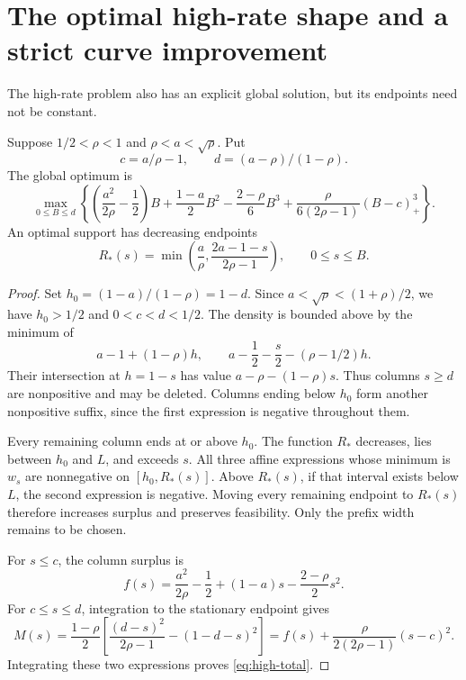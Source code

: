 \section{The optimal high-rate shape and a strict curve improvement}\label{sec:high-rate}

The high-rate problem also has an explicit global solution, but its endpoints need not be constant.
\begin{theorem}\label{thm:high-shape}
Suppose $1/2<\rho<1$ and $\rho<a<\sqrt\rho$. Put
\[
 c=a/\rho-1,\qquad d=(a-\rho)/(1-\rho).
\]
The global optimum is
\begin{equation}\label{eq:high-total}
 \max_{0\le B\le d}\left\{
 \left(\frac{a^2}{2\rho}-\frac12\right)B
 +\frac{1-a}{2}B^2-\frac{2-\rho}{6}B^3
 +\frac{\rho}{6(2\rho-1)}(B-c)_+^3\right\}.
\end{equation}
An optimal support has decreasing endpoints
\[
 R_*(s)=\min\left(\frac a\rho,\frac{2a-1-s}{2\rho-1}\right),\qquad 0\le s\le B.
\]
\end{theorem}
\begin{proof}
Set $h_0=(1-a)/(1-\rho)=1-d$. Since $a<\sqrt\rho<(1+\rho)/2$, we have $h_0>1/2$ and $0<c<d<1/2$. The density is bounded above by the minimum of
\[
 a-1+(1-\rho)h,\qquad a-\frac12-\frac s2-(\rho-1/2)h.
\]
Their intersection at $h=1-s$ has value $a-\rho-(1-\rho)s$. Thus columns $s\ge d$ are nonpositive and may be deleted. Columns ending below $h_0$ form another nonpositive suffix, since the first expression is negative throughout them.

Every remaining column ends at or above $h_0$. The function $R_*$ decreases, lies between $h_0$ and $L$, and exceeds $s$. All three affine expressions whose minimum is $w_s$ are nonnegative on $[h_0,R_*(s)]$. Above $R_*(s)$, if that interval exists below $L$, the second expression is negative. Moving every remaining endpoint to $R_*(s)$ therefore increases surplus and preserves feasibility. Only the prefix width remains to be chosen.

For $s\le c$, the column surplus is
\[
 f(s)=\frac{a^2}{2\rho}-\frac12+(1-a)s-\frac{2-\rho}{2}s^2.
\]
For $c\le s\le d$, integration to the stationary endpoint gives
\begin{equation}\label{eq:tail}
 M(s)=\frac{1-\rho}{2}
 \left[\frac{(d-s)^2}{2\rho-1}-(1-d-s)^2\right]
 =f(s)+\frac{\rho}{2(2\rho-1)}(s-c)^2.
\end{equation}
Integrating these two expressions proves \eqref{eq:high-total}.
\end{proof}


